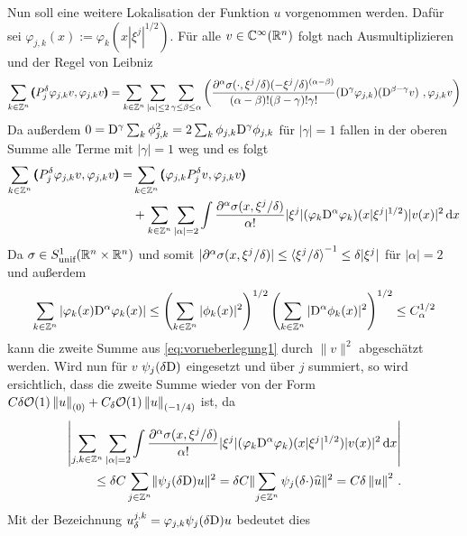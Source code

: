 Nun soll eine weitere Lokalisation der Funktion $u$ vorgenommen werden. Dafür sei $\varphi_{j,k}(x):=\varphi_k(x|\xi^j|^{1/2})$. Für alle $v\in\mathbb C^\infty(\mathbb R^n)$ folgt nach Ausmultiplizieren und der Regel von Leibniz
\begin{align}
\sum_{k\in\Z^n}\spro {P^\delta_j\varphi_{j,k}v} {\varphi_{j,k}v} = \sum_{k\in\Z^n}\sum_{|\alpha|\le 2}\sum_{\gamma\le\beta\le\alpha} \left({\frac{\partial^\alpha\sigma(\cdot,\xi^j/\delta)(-\xi^j/\delta)^{(\alpha-\beta)}}{(\alpha-\beta)!(\beta-\gamma)!\gamma!}(\D^\gamma\varphi_{j,k})(\D^{\beta-\gamma}v)}\ , {\varphi_{j,k}v}\right)
\end{align}
Da außerdem $0=\mathrm D^\gamma\sum_k\phi_{j,k}^2 = 2 \sum_k\phi_{j,k}\mathrm D^\gamma\phi_{j,k}$ für $|\gamma|=1$ fallen in der oberen Summe alle Terme mit $|\gamma|=1$ weg und es folgt
\begin{align}\label{eq:vorueberlegung1}
\sum_{k\in\mathbb Z^n}\pmb(P^\delta_j\varphi_{j,k}v,\varphi_{j,k}v\pmb) = &\sum_{k\in\mathbb Z^n}\pmb(\varphi_{j,k}P^\delta_jv,\varphi_{j,k}v\pmb) \\&+ \sum_{k\in\mathbb Z^n}\sum_{|\alpha|=2}\int \frac{\partial^\alpha\sigma(x,\xi^j/\delta)}{\alpha!} |\xi^j|(\varphi_k\mathrm D^\alpha\varphi_k)(x|\xi^j|^{1/2})|v(x)|^2\,\mathrm d x\nonumber
\end{align}
Da $\sigma\in S^1_\text{unif}(\mathbb R^n\times\mathbb R^n)$ und somit $|\partial^\alpha\sigma(x,\xi^j/\delta)|\le\braket{\xi^j/\delta}^{-1}\le \delta|\xi^j|$ für $|\alpha|=2$ und außerdem
\begin{align}
\sum_{k\in\mathbb Z^n} |\varphi_k(x)\mathrm D^\alpha\varphi_k(x)|\le \left(\sum_{k\in\mathbb Z^n}|\phi_k(x)|^2\right)^{1/2}\left(\sum_{k\in\mathbb Z^n}|\mathrm D^\alpha\phi_k(x)|^2\right)^{1/2}\le C_\alpha^{1/2}
\end{align}
kann die zweite Summe aus \eqref{eq:vorueberlegung1} durch $\|v\|^2$ abgeschätzt werden. Wird nun für $v$ $\psi_j(\delta\mathrm D)$ eingesetzt und über $j$ summiert, so wird ersichtlich, dass die zweite Summe wieder von der Form $C\delta \mathcal{O}(1) \left\lVert u\right\rVert_{(0)} + C_\delta \mathcal O(1)\left\lVert u\right\rVert_{(-1/4)}$ ist, da
\begin{align}
\left|\sum_{j,k\in\mathbb Z^n}\sum_{|\alpha|=2}\int \frac{\partial^\alpha\sigma(x,\xi^j/\delta)}{\alpha!} |\xi^j|(\varphi_k\mathrm D^\alpha\varphi_k)(x|\xi^j|^{1/2})|v(x)|^2\,\mathrm d x\right|\\ \le \delta C \sum_{j\in\mathbb Z^n} \lVert\psi_j(\delta\mathrm D)u\rVert^2 = \delta C \lVert\sum_{j\in\mathbb Z^n} \psi_j(\delta \cdot)\widehat u\rVert^2 = C \delta \left\lVert u\right\rVert ^2\,.
\end{align}
Mit der Bezeichnung $u_\delta^{j,k} = \varphi_{j,k} \psi_j(\delta\mathrm D)u$ bedeutet dies
